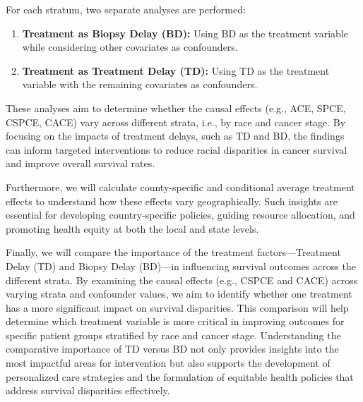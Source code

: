 \documentclass[useAMS,referee]{biom}
\begin{document}
For each stratum, two separate analyses are performed:
\begin{enumerate}
    \item \textbf{Treatment as Biopsy Delay (BD):} Using BD as the treatment variable while considering other covariates as confounders.
    \item \textbf{Treatment as Treatment Delay (TD):} Using TD as the treatment variable with the remaining covariates as confounders.
\end{enumerate}

These analyses aim to determine whether the causal effects (e.g., ACE, SPCE, CSPCE, CACE) vary across different strata, i.e., by race and cancer stage. By focusing on the impacts of treatment delays, such as TD and BD, the findings can inform targeted interventions to reduce racial disparities in cancer survival and improve overall survival rates.

Furthermore, we will calculate county-specific and conditional average treatment effects to understand how these effects vary geographically. Such insights are essential for developing country-specific policies, guiding resource allocation, and promoting health equity at both the local and state levels.

Finally, we will compare the importance of the treatment factors—Treatment Delay (TD) and Biopsy Delay (BD)—in influencing survival outcomes across the different strata. By examining the causal effects (e.g., CSPCE and CACE) across varying strata and confounder values, we aim to identify whether one treatment has a more significant impact on survival disparities. This comparison will help determine which treatment variable is more critical in improving outcomes for specific patient groups stratified by race and cancer stage. Understanding the comparative importance of TD versus BD not only provides insights into the most impactful areas for intervention but also supports the development of personalized care strategies and the formulation of equitable health policies that address survival disparities effectively.





\printbibliography
\end{document}
